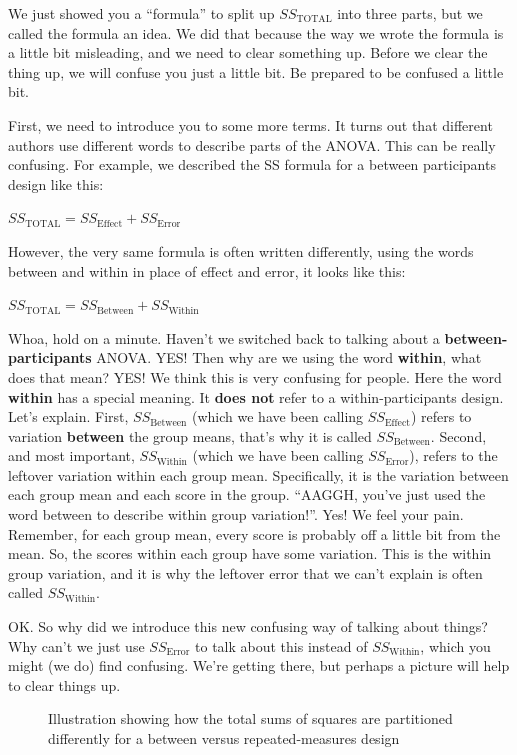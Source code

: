 \documentclass[
]{book}
\makeatletter
\newcommand*\pandocbounded[1]{%
  \sbox\pandoc@box{#1}%
  \Gscale@div\@tempa{\textheight}{\dimexpr\ht\pandoc@box+\dp\pandoc@box\relax}%
  \Gscale@div\@tempb{\linewidth}{\wd\pandoc@box}%
  \ifdim\@tempb\p@<\@tempa\p@\let\@tempa\@tempb\fi%
  \ifdim\@tempa\p@<\p@\scalebox{\@tempa}{\usebox\pandoc@box}%
  \else\usebox{\pandoc@box}%
  \fi%
}
\makeatother
\begin{document}
We just showed you a ``formula'' to split up \(SS_\text{TOTAL}\) into three parts, but we called the formula an idea. We did that because the way we wrote the formula is a little bit misleading, and we need to clear something up. Before we clear the thing up, we will confuse you just a little bit. Be prepared to be confused a little bit.

First, we need to introduce you to some more terms. It turns out that different authors use different words to describe parts of the ANOVA. This can be really confusing. For example, we described the SS formula for a between participants design like this:

\(SS_\text{TOTAL} = SS_\text{Effect} + SS_\text{Error}\)

However, the very same formula is often written differently, using the words between and within in place of effect and error, it looks like this:

\(SS_\text{TOTAL} = SS_\text{Between} + SS_\text{Within}\)

Whoa, hold on a minute. Haven't we switched back to talking about a \textbf{between-participants} ANOVA. YES! Then why are we using the word \textbf{within}, what does that mean? YES! We think this is very confusing for people. Here the word \textbf{within} has a special meaning. It \textbf{does not} refer to a within-participants design. Let's explain. First, \(SS_\text{Between}\) (which we have been calling \(SS_\text{Effect}\)) refers to variation \textbf{between} the group means, that's why it is called \(SS_\text{Between}\). Second, and most important, \(SS_\text{Within}\) (which we have been calling \(SS_\text{Error}\)), refers to the leftover variation within each group mean. Specifically, it is the variation between each group mean and each score in the group. ``AAGGH, you've just used the word between to describe within group variation!''. Yes! We feel your pain. Remember, for each group mean, every score is probably off a little bit from the mean. So, the scores within each group have some variation. This is the within group variation, and it is why the leftover error that we can't explain is often called \(SS_\text{Within}\).

OK. So why did we introduce this new confusing way of talking about things? Why can't we just use \(SS_\text{Error}\) to talk about this instead of \(SS_\text{Within}\), which you might (we do) find confusing. We're getting there, but perhaps a picture will help to clear things up.

\begin{figure}
\centering
\pandocbounded{\texttt{[image: figures/SS\_ANOVA.png]}}
\caption{\label{fig:8splitSS}Illustration showing how the total sums of squares are partitioned differently for a between versus repeated-measures design}
\end{figure}
\end{document}
